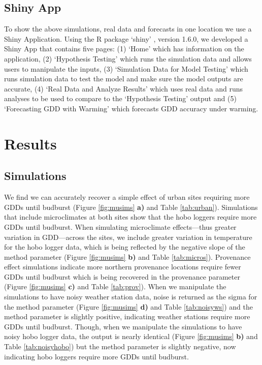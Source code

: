 \documentclass{article}\usepackage[]{graphicx}\usepackage[]{color}
\begin{document}
\subsection*{Shiny App}
To show the above simulations, real data and forecasts in one location we use a Shiny Application. Using the R package `shiny' \citep{shiny2021}, version 1.6.0, we developed a Shiny App that contains five pages: (1) `Home' which has information on the application, (2) `Hypothesis Testing' which runs the simulation data and allows users to manipulate the inputs, (3) `Simulation Data for Model Testing' which runs simulation data to test the model and make sure the model outputs are accurate, (4) `Real Data and Analyze Results' which uses real data and runs analyses to be used to compare to the `Hypothesis Testing' output and (5) `Forecasting GDD with Warming' which forecasts GDD accuracy under warming. 

\section*{Results}
\subsection*{Simulations}
We find we can accurately recover a simple effect of urban sites requiring more GDDs until budburst (Figure \ref{fig:musims} \textbf{a)} and Table \ref{tab:urban}). Simulations that include microclimates at both sites show that the hobo loggers require more GDDs until budburst. When simulating microclimate effects---thus greater variation in GDD---across the sites, we include greater variation in temperature for the hobo logger data, which is being reflected by the negative slope of the method parameter (Figure \ref{fig:musims} \textbf{b)} and Table \ref{tab:micros}). Provenance effect simulations indicate more northern provenance locations require fewer GDDs until budburst which is being recovered in the provenance parameter (Figure \ref{fig:musims} \textbf{c)} and Table \ref{tab:prov}). When we manipulate the simulations to have noisy weather station data, noise is returned as the sigma for the method parameter (Figure \ref{fig:musims} \textbf{d)} and Table \ref{tab:noisyws}) and the method parameter is slightly positive, indicating weather stations require more GDDs until budburst. Though, when we manipulate the simulations to have noisy hobo logger data, the output is nearly identical (Figure \ref{fig:musims} \textbf{b)} and Table \ref{tab:noisyhobo}) but the method parameter is slightly negative, now indicating hobo loggers require more GDDs until budburst.
  
\end{document}
